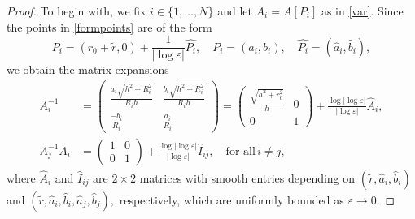 \documentclass[11pt,reqno,a4paper]{amsart}
\numberwithin{equation}{section}
\newcommand{\ve}{\varepsilon}
\begin{document}
\begin{proof}
 To begin with, we fix $i\in\{1,\dots,N\}$ and let $A_{i}=A[P_{i}]$ as in \eqref{var}. Since the points in \eqref{formpoints} are of the form \[P_i=(r_0+\tilde{r},0)+\frac{1}{|\log\ve|}\widehat{P_i}, \quad P_i=(a_i,b_i),\quad \widehat{P_i}=(\hat{a}_i,\hat{b}_i),\] we obtain the matrix expansions 
 \begin{equation}\label{expinverse}
 \begin{aligned}
 A_{i}^{-1}&=\begin{pmatrix}
     \frac{a_{i}\sqrt{h^2+R_i^2}}{R_i h} & \frac{b_i\sqrt{h^2+R_i^2}}{R_i h}\\
     \frac{-b_i}{R_i} & \frac{a_i}{R_i}\end{pmatrix}=\begin{pmatrix}
         \frac{\sqrt{h^2+r_0^2}}{h} & 0 \\ 0 & 1 \end{pmatrix} + \frac{\log|\log\ve|}{|\log\ve|}\widehat{A}_{i},\\ 
A_j^{-1}A_i&= \begin{pmatrix} 1 & 0 \\ 0 & 1 \end{pmatrix} +\frac{\log|\log\ve|}{|\log\ve|}\widehat{I}_{ij}, \quad \mbox{for all}\, i \neq j,
\end{aligned}
\end{equation}
where $\widehat{A}_{i}$ and $\widehat{I}_{ij}$ are $2\times 2$ matrices with smooth entries depending on $(\tilde{r},\hat{a}_i,\hat{b}_i)$ and $(\tilde{r},\hat{a}_i,\hat{b}_i,\hat{a}_j,\hat{b}_j),$ respectively, which are uniformly bounded as $\ve\to 0.$


\end{proof}
\end{document}
